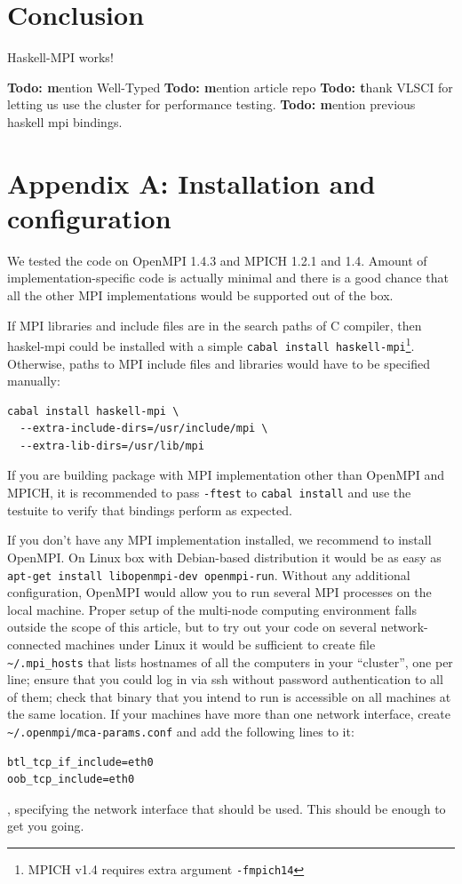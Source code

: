 \documentclass{tmr}
\newcommand{\Todo}[1]{{\textbf{Todo: #1}}}
\begin{document}
\section{Conclusion}

Haskell-MPI works!

\Todo mention Well-Typed
\Todo mention article repo
\Todo thank VLSCI for letting us use the cluster for performance testing.
\Todo mention previous haskell mpi bindings.

\section{Appendix A: Installation and configuration}
\label{appendix-A}
We tested the code on OpenMPI 1.4.3 and MPICH 1.2.1 and 1.4. Amount of
implementation-specific code is actually minimal and there is a good
chance that all the other MPI implementations would be supported out
of the box.

If MPI libraries and include files are in the search paths of C
compiler, then haskel-mpi could be installed with a simple 
\verb|cabal install haskell-mpi|\footnote{MPICH v1.4 requires extra argument \verb|-fmpich14|}. Otherwise, paths to MPI include
files and libraries would have to be specified manually:
\begin{Verbatim}
cabal install haskell-mpi \
  --extra-include-dirs=/usr/include/mpi \
  --extra-lib-dirs=/usr/lib/mpi
\end{Verbatim}

If you are building package with MPI implementation other than
OpenMPI and MPICH, it is recommended to pass \verb|-ftest| to
\verb|cabal install| and use the testuite to verify that bindings
perform as expected.

If you don't have any MPI implementation installed, we recommend to
install OpenMPI. On Linux box with Debian-based distribution it would
be as easy as \verb|apt-get install libopenmpi-dev openmpi-run|.
Without any additional configuration, OpenMPI would allow you to run
several MPI processes on the local machine. Proper setup of the
multi-node computing environment falls outside the scope of this
article, but to try out your code on several network-connected
machines under Linux it would be sufficient to create file \verb|~/.mpi_hosts|
that lists hostnames of all the computers in your ``cluster'', one per
line; ensure that you could log in via ssh without password
authentication to all of them; check that binary that you intend to
run is accessible on all machines at the same location. If your
machines have more than one network interface, create
\verb|~/.openmpi/mca-params.conf| and add the following lines to it:
\begin{Verbatim}
btl_tcp_if_include=eth0
oob_tcp_include=eth0
\end{Verbatim}
, specifying the network interface that should be used. This should be enough to get you going.


\end{document}
